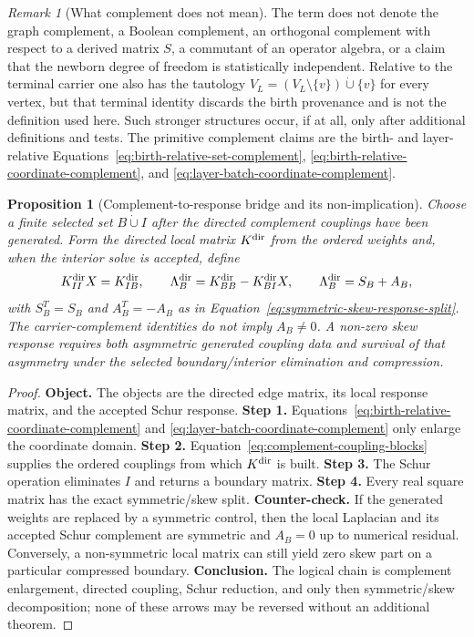 \documentclass[11pt]{article}
\newtheorem{proposition}[definition]{Proposition}
\theoremstyle{remark}
\newtheorem{remark}[definition]{Remark}
\numberwithin{equation}{section}
\begin{document}
\begin{remark}[What complement does not mean]
The term does not denote the graph complement, a Boolean complement, an orthogonal complement with respect to a derived matrix $S$, a commutant of an operator algebra, or a claim that the newborn degree of freedom is statistically independent. Relative to the terminal carrier one also has the tautology $V_L=(V_L\setminus\{v\})\dot\cup\{v\}$ for every vertex, but that terminal identity discards the birth provenance and is not the definition used here. Such stronger structures occur, if at all, only after additional definitions and tests. The primitive complement claims are the birth- and layer-relative Equations~\eqref{eq:birth-relative-set-complement}, \eqref{eq:birth-relative-coordinate-complement}, and \eqref{eq:layer-batch-coordinate-complement}.
\end{remark}

\begin{proposition}[Complement-to-response bridge and its non-implication]
Choose a finite selected set $B\dot\cup I$ after the directed complement couplings have been generated. Form the directed local matrix $K^{\rm dir}$ from the ordered weights and, when the interior solve is accepted, define
\begin{equation}
  K^{\rm dir}_{II}X=K^{\rm dir}_{IB},
  \qquad
  \Lambda_B^{\rm dir}=K^{\rm dir}_{BB}-K^{\rm dir}_{BI}X,
  \qquad
  \Lambda_B^{\rm dir}=S_B+A_B,
  \label{eq:complement-to-directed-response}
\end{equation}
with $S_B^T=S_B$ and $A_B^T=-A_B$ as in Equation~\eqref{eq:symmetric-skew-response-split}. The carrier-complement identities do not imply $A_B\ne0$. A non-zero skew response requires both asymmetric generated coupling data and survival of that asymmetry under the selected boundary/interior elimination and compression.
\end{proposition}
\begin{proof}
\textbf{Object.} The objects are the directed edge matrix, its local response matrix, and the accepted Schur response. \textbf{Step 1.} Equations~\eqref{eq:birth-relative-coordinate-complement} and \eqref{eq:layer-batch-coordinate-complement} only enlarge the coordinate domain. \textbf{Step 2.} Equation~\eqref{eq:complement-coupling-blocks} supplies the ordered couplings from which $K^{\rm dir}$ is built. \textbf{Step 3.} The Schur operation eliminates $I$ and returns a boundary matrix. \textbf{Step 4.} Every real square matrix has the exact symmetric/skew split. \textbf{Counter-check.} If the generated weights are replaced by a symmetric control, then the local Laplacian and its accepted Schur complement are symmetric and $A_B=0$ up to numerical residual. Conversely, a non-symmetric local matrix can still yield zero skew part on a particular compressed boundary. \textbf{Conclusion.} The logical chain is complement enlargement, directed coupling, Schur reduction, and only then symmetric/skew decomposition; none of these arrows may be reversed without an additional theorem.
\end{proof}
\end{document}

